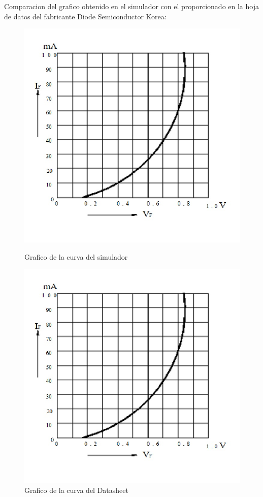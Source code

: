 \documentclass[chaptersright]{informeutn}
\begin{document}
        Comparacion del grafico obtenido en el simulador con el proporcionado en la hoja de datos del fabricante
        Diode Semiconductor Korea:

        \begin{figure}[!h]
          \centering
          \begin{minipage}[b]{0.4\textwidth}
            \includegraphics[width=1.1\linewidth]{pictures/Curva_Datash_Ge.jpg}
            \caption{Grafico de la curva del simulador}
          \end{minipage}
          \hfill
          \begin{minipage}[b]{0.4\textwidth}
            \includegraphics[width=1.1\linewidth]{pictures/Curva_Datash_Ge.jpg}
            \caption{Grafico de la curva del Datasheet}
          \end{minipage}
        \end{figure}
\end{document}

